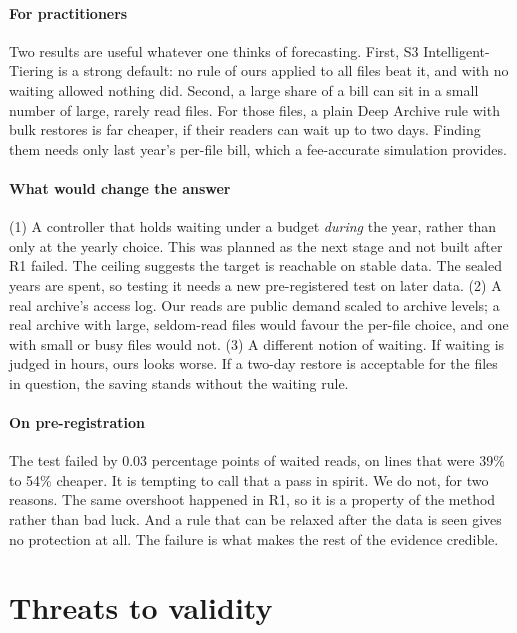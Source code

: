 \documentclass[11pt]{article}
\begin{document}
\paragraph{For practitioners} Two results are useful whatever one thinks of forecasting. First, S3 Intelligent-Tiering is a strong default: no rule of ours applied to all files beat it, and with no waiting allowed nothing did. Second, a large share of a bill can sit in a small number of large, rarely read files. For those files, a plain Deep Archive rule with bulk restores is far cheaper, if their readers can wait up to two days. Finding them needs only last year's per-file bill, which a fee-accurate simulation provides.

\paragraph{What would change the answer} (1) A controller that holds waiting under a budget \emph{during} the year, rather than only at the yearly choice. This was planned as the next stage and not built after R1 failed. The ceiling suggests the target is reachable on stable data. The sealed years are spent, so testing it needs a new pre-registered test on later data. (2) A real archive's access log. Our reads are public demand scaled to archive levels; a real archive with large, seldom-read files would favour the per-file choice, and one with small or busy files would not. (3) A different notion of waiting. If waiting is judged in hours, ours looks worse. If a two-day restore is acceptable for the files in question, the saving stands without the waiting rule.

\paragraph{On pre-registration} The test failed by 0.03 percentage points of waited reads, on lines that were 39\% to 54\% cheaper. It is tempting to call that a pass in spirit. We do not, for two reasons. The same overshoot happened in R1, so it is a property of the method rather than bad luck. And a rule that can be relaxed after the data is seen gives no protection at all. The failure is what makes the rest of the evidence credible.

\section{Threats to validity}
\label{sec:threats}
\end{document}
